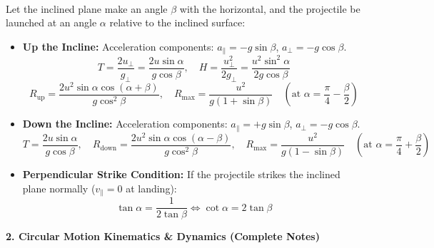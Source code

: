 \documentclass[11pt,a4paper]{article}
\begin{document}
\vspace{5pt}
\noindent{\large\textbf{\textsf{\textcolor{primaryDark}{1.7 Projectile Motion on an Inclined Plane (From Notes)}}}}\\[3pt]
Let the inclined plane make an angle $\beta$ with the horizontal, and the projectile be launched at an angle $\alpha$ relative to the inclined surface:
\begin{itemize}[leftmargin=14pt,itemsep=2.5pt]
  \item \textbf{Up the Incline:} Acceleration components: $a_\parallel = -g\sin\beta$, $a_\perp = -g\cos\beta$.
  \[
    T = \frac{2u_\perp}{g_\perp} = \frac{2u\sin\alpha}{g\cos\beta}, \quad H = \frac{u_\perp^2}{2g_\perp} = \frac{u^2\sin^2\alpha}{2g\cos\beta}
  \]
  \[
    R_{\text{up}} = \frac{2u^2\sin\alpha\cos(\alpha + \beta)}{g\cos^2\beta}, \quad R_{\max} = \frac{u^2}{g(1 + \sin\beta)} \quad \left(\text{at } \alpha = \frac{\pi}{4} - \frac{\beta}{2}\right)
  \]
  \item \textbf{Down the Incline:} Acceleration components: $a_\parallel = +g\sin\beta$, $a_\perp = -g\cos\beta$.
  \[
    T = \frac{2u\sin\alpha}{g\cos\beta}, \quad R_{\text{down}} = \frac{2u^2\sin\alpha\cos(\alpha - \beta)}{g\cos^2\beta}, \quad R_{\max} = \frac{u^2}{g(1 - \sin\beta)} \quad \left(\text{at } \alpha = \frac{\pi}{4} + \frac{\beta}{2}\right)
  \]
  \item \textbf{Perpendicular Strike Condition:} If the projectile strikes the inclined plane normally ($v_\parallel = 0$ at landing):
  \[
    \tan\alpha = \frac{1}{2\tan\beta} \iff \cot\alpha = 2\tan\beta
  \]
\end{itemize}

\vspace{10pt}

\begin{tcolorbox}[chapterbanner]
  {\Large \textbf{\textsf{2. Circular Motion Kinematics \& Dynamics (Complete Notes)}}}
\end{tcolorbox}
\vspace{4pt}
\end{document}
